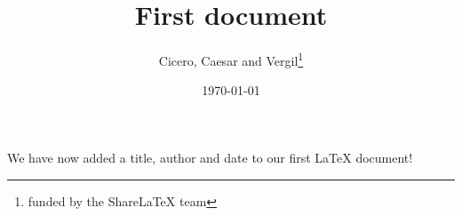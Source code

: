\documentclass[12pt, a4paper, twoside]{article}
\title{First document}
\author{Cicero, Caesar and Vergil\thanks{funded by the ShareLaTeX team}}
\date{\today}
\begin{document}
	
	\maketitle
	
	We have now added a title, author and date to our first {\LaTeX} document!
	
\end{document}
